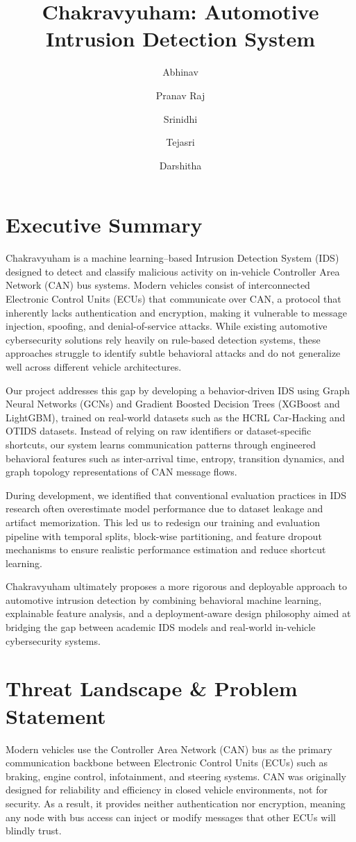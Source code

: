 \documentclass{article}
\title{\textbf{Chakravyuham: Automotive Intrusion Detection System}}
\author{Abhinav \and Pranav Raj \and Srinidhi \and Tejasri \and Darshitha}
\date{}
\begin{document}
\maketitle

\section{Executive Summary}
Chakravyuham is a machine learning–based Intrusion Detection System (IDS) designed to detect and classify malicious activity on in-vehicle Controller Area Network (CAN) bus systems. Modern vehicles consist of interconnected Electronic Control Units (ECUs) that communicate over CAN, a protocol that inherently lacks authentication and encryption, making it vulnerable to message injection, spoofing, and denial-of-service attacks. While existing automotive cybersecurity solutions rely heavily on rule-based detection systems, these approaches struggle to identify subtle behavioral attacks and do not generalize well across different vehicle architectures.

Our project addresses this gap by developing a behavior-driven IDS using Graph Neural Networks (GCNs) and Gradient Boosted Decision Trees (XGBoost and LightGBM), trained on real-world datasets such as the HCRL Car-Hacking and OTIDS datasets. Instead of relying on raw identifiers or dataset-specific shortcuts, our system learns communication patterns through engineered behavioral features such as inter-arrival time, entropy, transition dynamics, and graph topology representations of CAN message flows.

During development, we identified that conventional evaluation practices in IDS research often overestimate model performance due to dataset leakage and artifact memorization. This led us to redesign our training and evaluation pipeline with temporal splits, block-wise partitioning, and feature dropout mechanisms to ensure realistic performance estimation and reduce shortcut learning.

Chakravyuham ultimately proposes a more rigorous and deployable approach to automotive intrusion detection by combining behavioral machine learning, explainable feature analysis, and a deployment-aware design philosophy aimed at bridging the gap between academic IDS models and real-world in-vehicle cybersecurity systems.

\section{Threat Landscape \& Problem Statement}
Modern vehicles use the Controller Area Network (CAN) bus as the primary communication backbone between Electronic Control Units (ECUs) such as braking, engine control, infotainment, and steering systems. CAN was originally designed for reliability and efficiency in closed vehicle environments, not for security. As a result, it provides neither authentication nor encryption, meaning any node with bus access can inject or modify messages that other ECUs will blindly trust.
\end{document}
